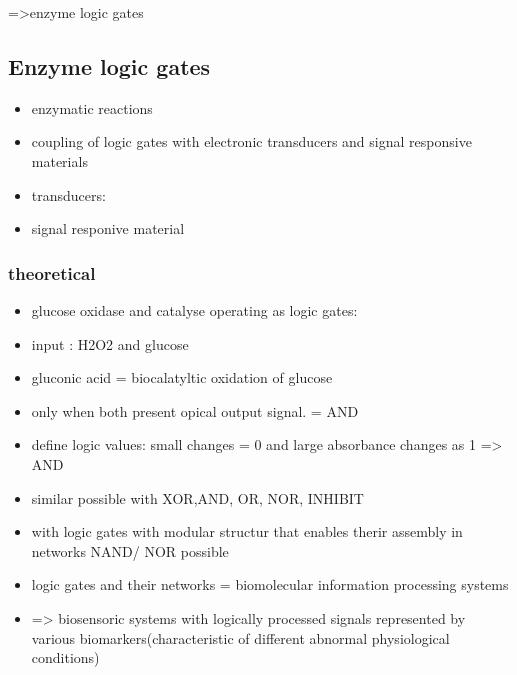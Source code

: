 \documentclass[runningheads]{llncs}
\begin{document}
	=>enzyme logic gates

\subsection{Enzyme logic gates}
	\begin{itemize}
		\item enzymatic reactions
		\item coupling of logic gates with electronic transducers and signal responsive materials
		\item transducers:
		\item signal responive material
		
	\end{itemize}
\subsubsection{theoretical}
	
	\begin{itemize}
		\item glucose oxidase and catalyse operating as logic gates: 
		\item input : H2O2 and glucose
		\item gluconic acid = biocalatyltic oxidation of glucose 
		\item only when both present opical output signal. = AND
		\item define logic values: small changes = 0 and large absorbance changes as 1 => AND
		\item similar possible with XOR,AND, OR, NOR, INHIBIT
		\item with logic gates with modular structur that enables therir assembly in networks NAND/ NOR possible
		\item logic gates and their networks = biomolecular information processing systems 
		\item => biosensoric systems with logically processed signals represented by various biomarkers(characteristic of different abnormal physiological conditions)
	\end{itemize}
\end{document}
